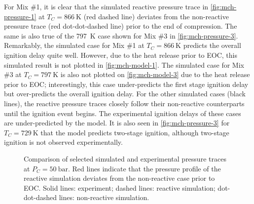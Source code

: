 \documentclass[../main.tex]{subfiles}
\begin{document}
For Mix \#1, it is clear that the simulated reactive pressure trace in
\cref{fig:mch-pressure-1} at $T_C=\SI{866}{\kelvin}$ (red dashed line) deviates from
the non-reactive pressure trace (red dot-dot-dashed line) prior to the end of
compression. The same is also true of the \SI{797}{\kelvin} case shown for Mix \#3 in
\cref{fig:mch-pressure-3}. Remarkably, the simulated case for Mix \#1 at
$T_C=\SI{866}{\kelvin}$ predicts the overall ignition delay quite well. However, due to the
heat release prior to EOC, this simulated result is not plotted in
\cref{fig:mch-model-1}. The simulated case for Mix \#3 at $T_C=\SI{797}{\kelvin}$ is also
not plotted on \cref{fig:mch-model-3} due to the heat release prior to EOC;
interestingly, this case under-predicts the first stage ignition delay but
over-predicts the overall ignition delay. For the other simulated cases (black
lines), the reactive pressure traces closely follow their non-reactive
counterparts until the ignition event begins. The experimental ignition delays
of these cases are under-predicted by the model. It is also seen in
\cref{fig:mch-pressure-3} for $T_C=\SI{729}{\kelvin}$ that the model predicts two-stage
ignition, although two-stage ignition is not observed experimentally.

\begin{figure}
    {\caption{Comparison of selected simulated and experimental pressure traces
        at $P_C=\SI{50}{\bar}$. Red lines
        indicate that the pressure profile of the reactive simulation deviates
        from the non-reactive case prior to EOC. Solid lines: experiment;
        dashed lines: reactive simulation; dot-dot-dashed lines: non-reactive
        simulation.}
    \label{fig:mch-pressure}}
\end{figure}
\end{document}
